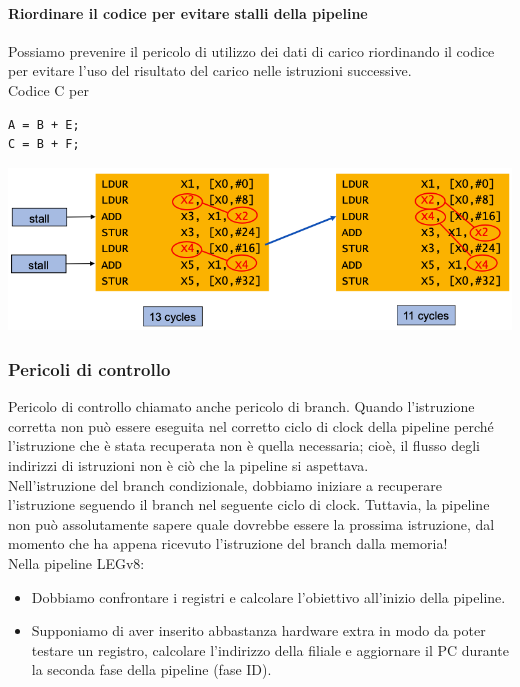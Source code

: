 \documentclass[12pt,a4paper]{article}
\begin{document}
\paragraph{Riordinare il codice per evitare stalli della pipeline} Possiamo prevenire il pericolo di utilizzo dei dati di carico riordinando il codice per evitare l'uso del risultato del carico nelle istruzioni successive.\\
Codice C per
\begin{center}
\begin{minipage}{.2\linewidth}
\begin{verbatim}
A = B + E;
C = B + F;
\end{verbatim}
\end{minipage}
\end{center}
\begin{center}
\includegraphics[width=0.6\columnwidth]{img/stall_reorder.png}
\end{center}

\subsubsection{Pericoli di controllo}
Pericolo di controllo chiamato anche pericolo di branch. Quando l'istruzione corretta non può essere eseguita nel corretto ciclo di clock della pipeline perché l'istruzione che è stata recuperata non è quella necessaria; cioè, il flusso degli indirizzi di istruzioni non è ciò che la pipeline si aspettava.\\
Nell'istruzione del branch condizionale, dobbiamo iniziare a recuperare l'istruzione seguendo il branch nel seguente ciclo di clock. Tuttavia, la pipeline non può assolutamente sapere quale dovrebbe essere la prossima istruzione, dal momento che ha appena ricevuto l'istruzione del branch dalla memoria!\\
Nella pipeline LEGv8:
\begin{itemize}
\item Dobbiamo confrontare i registri e calcolare l'obiettivo all'inizio della pipeline.
\item Supponiamo di aver inserito abbastanza hardware extra in modo da poter testare un registro, calcolare l'indirizzo della filiale e aggiornare il PC durante la seconda fase della pipeline (fase ID).
\end{itemize}
\end{document}
